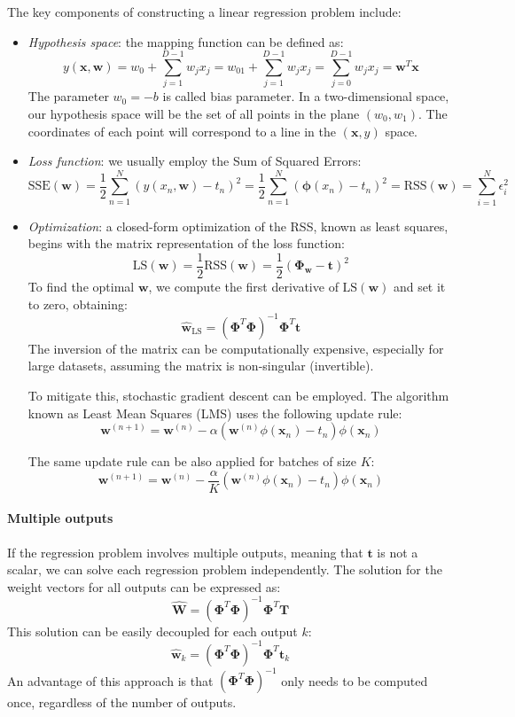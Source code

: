 The key components of constructing a linear regression problem include:
\begin{itemize}
    \item \textit{Hypothesis space}: the mapping function can be defined as: 
        \[y(\mathbf{x},\mathbf{w})=w_0+\sum_{j=1}^{D-1}w_j x_j=w_01+\sum_{j=1}^{D-1}w_j x_j=\sum_{j=0}^{D-1}w_j x_j=\mathbf{w}^T\mathbf{x}\]
        The parameter $w_0=-b$ is called bias parameter. 
        In a two-dimensional space, our hypothesis space will be the set of all points in the plane $(w_0,w_1)$. 
        The coordinates of each point will correspond to a line in the $\left( \mathbf{x}, y \right)$ space.
    \item \textit{Loss function}: we usually employ the Sum of Squared Errors: 
            \[\text{SSE}(\mathbf{w})=\dfrac{1}{2}\sum_{n=1}^{N}{\left( y(x_n, \mathbf{w})-t_n \right)}^2=\dfrac{1}{2}\sum_{n=1}^{N}{\left( \boldsymbol{\phi}(x_n)-t_n \right)}^2=\text{RSS}(\mathbf{w})=\sum_{i=1}^{N}\epsilon^2_i\]
    \item \textit{Optimization}: a closed-form optimization of the RSS, known as least squares, begins with the matrix representation of the loss function:
        \[\text{LS}(\mathbf{w})=\dfrac{1}{2}\text{RSS}(\mathbf{w})=\dfrac{1}{2}{\left( \boldsymbol{\Phi}_{\mathbf{w}}-\mathbf{t} \right)}^2\]
        To find the optimal $\mathbf{w}$, we compute the first derivative of $\text{LS}(\mathbf{w})$ and set it to zero, obtaining: 
        \[\hat{\mathbf{w}}_{\text{LS}}={( \boldsymbol{\Phi}^T\boldsymbol{\Phi})}^{-1}\boldsymbol{\Phi}^T\mathbf{t}\]
        The inversion of the matrix can be computationally expensive, especially for large datasets, assuming the matrix is non-singular (invertible). 
        
        To mitigate this, stochastic gradient descent can be employed.
        The algorithm known as Least Mean Squares (LMS) uses the following update rule:
        \[\mathbf{w}^{(n+1)}= \mathbf{w}^{(n)}-\alpha\left( \mathbf{w}^{(n)}\phi(\mathbf{x}_n)-t_n \right)\phi(\mathbf{x}_n)\]

        The same update rule can be also applied for batches of size $K$: 
        \[\mathbf{w}^{(n+1)}= \mathbf{w}^{(n)}-\dfrac{\alpha}{K}\left( \mathbf{w}^{(n)}\phi(\mathbf{x}_n)-t_n \right)\phi(\mathbf{x}_n)\]
\end{itemize}

\paragraph*{Multiple outputs}
If the regression problem involves multiple outputs, meaning that $\mathbf{t}$ is not a scalar, we can solve each regression problem independently.
The solution for the weight vectors for all outputs can be expressed as:
\[\hat{\mathbf{W}}={\left( \boldsymbol{\Phi}^T\boldsymbol{\Phi}\right)}^{-1}\boldsymbol{\Phi}^T\mathbf{T}\]
This solution can be easily decoupled for each output $k$: 
\[\hat{\mathbf{w}}_k={\left( \boldsymbol{\Phi}^T\boldsymbol{\Phi}\right)}^{-1}\boldsymbol{\Phi}^T\mathbf{t}_k\]
An advantage of this approach is that ${\left( \boldsymbol{\Phi}^T\boldsymbol{\Phi}\right)}^{-1}$ only needs to be computed once, regardless of the number of outputs.

